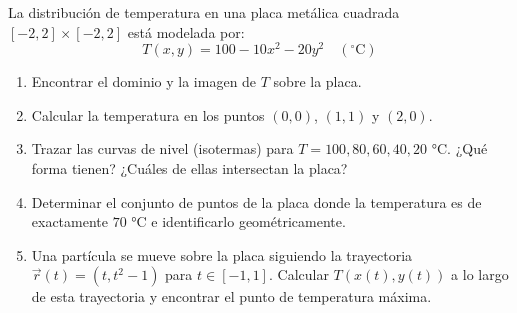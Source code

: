 La distribución de temperatura en una placa metálica cuadrada $[-2,2]\times[-2,2]$ está modelada por:
\[ T(x,y) = 100 - 10x^2 - 20y^2 \quad (^\circ\text{C}) \]
\begin{enumerate}
    \item Encontrar el dominio y la imagen de $T$ sobre la placa.
    \item Calcular la temperatura en los puntos $(0,0)$, $(1,1)$ y $(2, 0)$.
    \item Trazar las curvas de nivel (isotermas) para $T = 100, 80, 60, 40, 20$ °C. ¿Qué forma tienen? ¿Cuáles de ellas intersectan la placa?
    \item Determinar el conjunto de puntos de la placa donde la temperatura es de exactamente $70$ °C e identificarlo geométricamente.
    \item Una partícula se mueve sobre la placa siguiendo la trayectoria $\vec{r}(t) = (t, t^2 - 1)$ para $t \in [-1, 1]$. Calcular $T(x(t), y(t))$ a lo largo de esta trayectoria y encontrar el punto de temperatura máxima.
\end{enumerate}